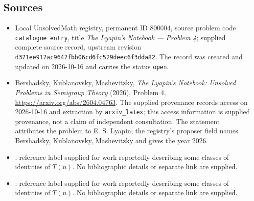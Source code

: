 \documentclass[11pt]{article}
\begin{document}
\subsection{Sources}
\begin{itemize}
\item Local UnsolvedMath registry, permanent ID \(800004\), source problem code \texttt{catalogue entry}, title \emph{The Lyapin's Notebook --- Problem 4}; supplied complete source record, upstream revision \texttt{d371ee917ac9647fbb06cd6fc529deec6f3dda82}. The record was created and updated on 2026-10-16 and carries the status \texttt{open}.
\item Bershadsky, Kublanovsky, Mashevitzky, \emph{The Lyapin's Notebook: Unsolved Problems in Semigroup Theory} (2026), Problem 4, \url{https://arxiv.org/abs/2604.04763}. The supplied provenance records access on 2026-10-16 and extraction by \texttt{arxiv\_latex}; this access information is supplied provenance, not a claim of independent consultation. The statement attributes the problem to E. S. Lyapin; the registry's proposer field names Bershadsky, Kublanovsky, Mashevitzky and gives the year 2026.
\item [PSSSV]: reference label supplied for work reportedly describing some classes of identities of \(T(n)\). No bibliographic details or separate link are supplied.
\item [Ma3]: reference label supplied for work reportedly describing some classes of identities of \(T(n)\). No bibliographic details or separate link are supplied.
\end{itemize}
\end{document}

